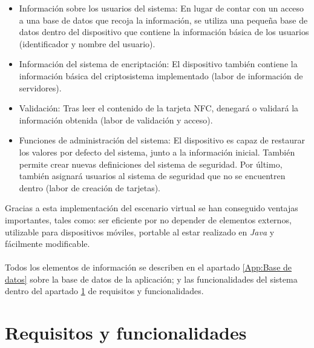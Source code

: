 \documentclass[../PFC.tex]{subfiles}
\begin{document}
\begin{itemize}
\item{Información sobre los usuarios del sistema: En lugar de contar con un acceso a una base de datos que recoja la información, se utiliza una pequeña base de datos dentro del dispositivo que contiene la información básica de los usuarios (identificador y nombre del usuario).}
\item{Información del sistema de encriptación: El dispositivo también contiene la información básica del criptosistema implementado (labor de información de servidores).}
\item{Validación: Tras leer el contenido de la tarjeta NFC, denegará o validará la información obtenida (labor de validación y acceso).}
\item{Funciones de administración del sistema: El dispositivo es capaz de restaurar los valores por defecto del sistema, junto a la información inicial. También permite crear nuevas definiciones del sistema de seguridad. Por último, también asignará usuarios al sistema de seguridad que no se encuentren dentro (labor de creación de tarjetas).}
\end{itemize}

Gracias a esta implementación del escenario virtual se han conseguido ventajas importantes, tales como: ser eficiente por no depender de elementos externos, utilizable para dispositivos móviles, portable al estar realizado en \textit{Java} y fácilmente modificable.
\\\\
Todos los elementos de información se describen en el apartado \ref{App:Base de datos} sobre la base de datos de la aplicación; y las funcionalidades del sistema dentro del apartado \ref{App:Requisitos y funcionalidades} de requisitos y funcionalidades.

\section{Requisitos y funcionalidades}
\label{App:Requisitos y funcionalidades}
\end{document}
